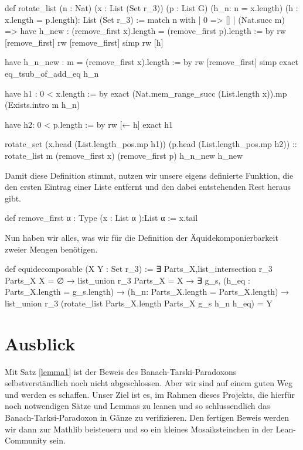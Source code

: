 \documentclass[10pt]{article}
\begin{document}
\begin{leancode}
def rotate_list (n : Nat) (x : List (Set r_3)) (p : List G) (h_n: n = x.length) 
(h : x.length = p.length): List (Set r_3) :=
  match n with
  | 0 => []
  | (Nat.succ m) =>
      have h_new : (remove_first x).length = (remove_first p).length := by
        rw [remove_first]
        rw [remove_first]
        simp
        rw [h]

      have h_n_new : m = (remove_first x).length := by
        rw [remove_first]
        simp
        exact eq_tsub_of_add_eq h_n

      have h1 : 0 < x.length :=  by
        exact (Nat.mem_range_succ (List.length x)).mp (Exists.intro m h_n)

      have h2: 0 < p.length := by
        rw [← h]
        exact h1

      rotate_set (x.head (List.length_pos.mp h1)) (p.head (List.length_pos.mp h2))
                    :: rotate_list m (remove_first x) (remove_first p) h_n_new h_new
\end{leancode}
\noindent Damit diese Definition stimmt, nutzen wir unsere eigens definierte Funktion, die den ersten Eintrag einer Liste entfernt und den dabei entstehenden Rest heraus gibt.
\begin{leancode}
def remove_first {α : Type} (x : List α ):List α :=
  x.tail
\end{leancode}
\noindent Nun haben wir alles, was wir für die Definition der Äquidekomponierbarkeit zweier Mengen benötigen.
\begin{leancode}
def equidecomposable (X Y : Set r_3) :=
  ∃ Parts_X,list_intersection r_3 Parts_X X = ∅ →
  list_union r_3 Parts_X = X →
  ∃ g_s, (h_eq : Parts_X.length = g_s.length) → (h_n: Parts_X.length = Parts_X.length) →
  list_union r_3 (rotate_list Parts_X.length Parts_X g_s h_n h_eq) = Y
\end{leancode}
\section{Ausblick}
Mit Satz \ref{lemma1} ist der Beweis des Banach-Tarski-Paradoxons selbstverständlich noch nicht abgeschlossen. Aber wir sind auf einem guten Weg und werden es schaffen. Unser Ziel ist es, im Rahmen dieses Projekts, die hierfür noch notwendigen Sätze und Lemmas zu leanen und so schlussendlich das Banach-Tarksi-Paradoxon in Gänze zu verifizieren. Den fertigen Beweis werden wir dann zur Mathlib beisteuern und so ein kleines Mosaiksteinchen in der Lean-Community sein. 
\end{document}

